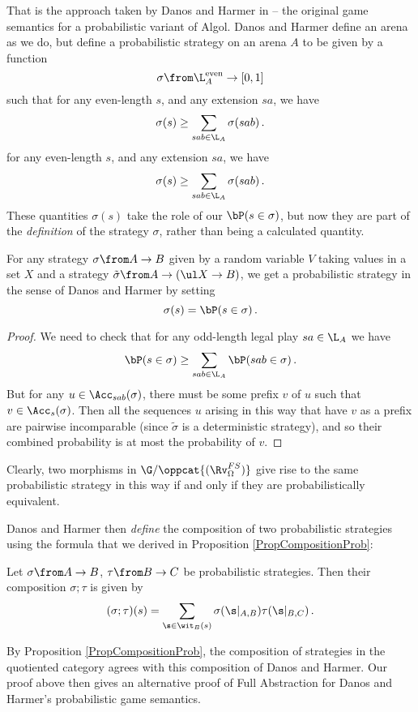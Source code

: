 That is the approach taken by Danos and Harmer in \cite{DanosHarmer} -- the original game semantics for a probabilistic variant of Algol.  
Danos and Harmer define an arena as we do, but define a probabilistic strategy on an arena $A$ to be given by a function
\[
  \sigma \from \L_A^{\text{even}} \to [0,1]
  \]
such that for any even-length $s$, and any extension $sa$, we have
\[
  \sigma(s) \ge \sum_{sab\in\L_A} \sigma(sab)\,.
  \]for any even-length $s$, and any extension $sa$, we have
\[
  \sigma(s) \ge \sum_{sab\in\L_A} \sigma(sab)\,.
  \]
These quantities $\sigma(s)$ take the role of our $\bP(s\in\sigma)$, but now they are part of the \emph{definition} of the strategy $\sigma$, rather than being a calculated quantity.

\begin{proposition}
  For any \Mellies strategy $\sigma\from A \to B$ given by a random variable $V$ taking values in a set $X$ and a strategy $\tilde\sigma \from A \to (\ul X \to B)$, we get a probabilistic strategy in the sense of Danos and Harmer by setting
  \[
    \sigma(s)=\bP(s\in\sigma)\,.
    \]
\end{proposition}
\begin{proof}
  We need to check that for any odd-length legal play $sa\in \L_A$ we have
  \[
    \bP(s\in\sigma) \ge \sum_{sab\in \L_A} \bP(sab\in\sigma)\,.
    \]
  But for any $u\in\Acc_{sab}(\sigma)$, there must be some prefix $v$ of $u$ such that $v\in\Acc_s(\sigma)$.
  Then all the sequences $u$ arising in this way that have $v$ as a prefix are pairwise incomparable (since $\tilde\sigma$ is a deterministic strategy), and so their combined probability is at most the probability of $v$.
\end{proof}
Clearly, two morphisms in $\G/\oppcat{(\Rv_\Omega^{FS})}$ give rise to the same probabilistic strategy in this way if and only if they are probabilistically equivalent.

Danos and Harmer then \emph{define} the composition of two probabilistic strategies using the formula that we derived in Proposition \ref{PropCompositionProb}:

\begin{definition}
  Let $\sigma\from A \to B$, $\tau \from B \to C$ be probabilistic strategies.  
  Then their composition $\sigma;\tau$ is given by
  \[
    (\sigma;\tau)(s) = \sum_{\s\in\wit_B(s)} \sigma(\s\vert_{A,B})\tau(\s\vert_{B,C})\,.
    \]
\end{definition}
By Proposition \ref{PropCompositionProb}, the composition of strategies in the quotiented category agrees with this composition of Danos and Harmer.
Our proof above then gives an alternative proof of Full Abstraction for Danos and Harmer's probabilistic game semantics.
